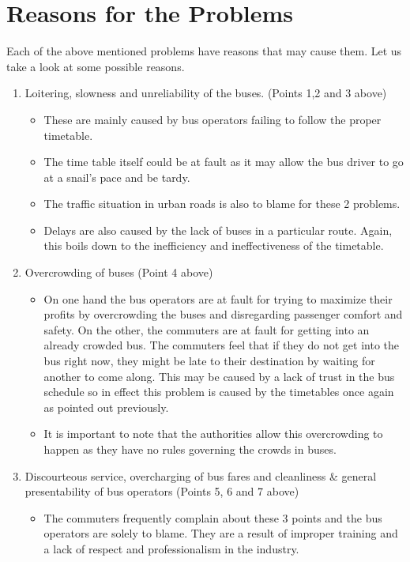 \documentclass[12pt, oneside]{report}
\begin{document}
\section{Reasons for the Problems}
Each of the above mentioned problems have reasons that may cause them. Let us take a look at some possible reasons.
\begin {enumerate}
\item Loitering, slowness and unreliability of the buses. (Points 1,2 and 3 above)
\begin {itemize}
\item These are mainly caused by bus operators failing to follow the proper timetable.
\item The time table itself could be at fault as it may allow the bus driver to go at a snail’s pace and be tardy.
\item The traffic situation in urban roads is also to blame for these 2 problems.
\item Delays are also caused by the lack of buses in a particular route. Again, this boils down to the inefficiency and ineffectiveness of the timetable.
\end {itemize}
\item Overcrowding of buses (Point 4 above)
\begin {itemize}
\item On one hand the bus operators are at fault for trying to maximize their profits by overcrowding the buses and disregarding passenger comfort and safety. On the other, the commuters are at fault for getting into an already crowded bus. The commuters feel that if they do not get into the bus right now, they might be late to their destination by waiting for another to come along. This may be caused by a lack of trust in the bus schedule so in effect this problem is caused by the timetables once again as pointed out previously.
\item It is important to note that the authorities allow this overcrowding to happen as they have no rules governing the crowds in buses.
\end {itemize}
\item Discourteous service, overcharging of bus fares and cleanliness \& general presentability of bus operators (Points 5, 6 and 7 above)
\begin {itemize}
\item The commuters frequently complain about these 3 points and the bus operators are solely to blame. They are a result of improper training and a lack of respect and professionalism in the industry.

\end{itemize}
\end{enumerate}
\end{document}
